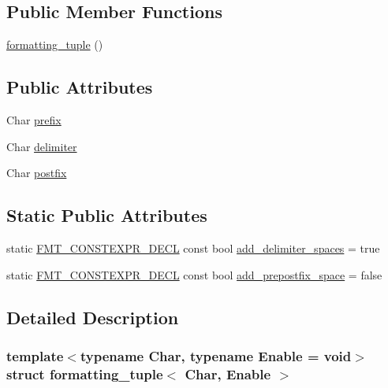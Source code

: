 \subsection*{Public Member Functions}
\begin{DoxyCompactItemize}
\item 
\hyperlink{structformatting__tuple_afe0ff5245dd3f9b567e55b9dd724dba9}{formatting\+\_\+tuple} ()
\end{DoxyCompactItemize}
\subsection*{Public Attributes}
\begin{DoxyCompactItemize}
\item 
Char \hyperlink{structformatting__tuple_a0782dad994369d31b822bcd23456dcd6}{prefix}
\item 
Char \hyperlink{structformatting__tuple_a41a084f3a72cc6bfa848e57dff30b4ed}{delimiter}
\item 
Char \hyperlink{structformatting__tuple_a7e5bf94913811fbd2b551e38c88146d6}{postfix}
\end{DoxyCompactItemize}
\subsection*{Static Public Attributes}
\begin{DoxyCompactItemize}
\item 
static \hyperlink{core_8h_af4388801466a5994a363d6005616371a}{F\+M\+T\+\_\+\+C\+O\+N\+S\+T\+E\+X\+P\+R\+\_\+\+D\+E\+CL} const bool \hyperlink{structformatting__tuple_ac37833d9d42f1fe21c2203a8621e71d6}{add\+\_\+delimiter\+\_\+spaces} = true
\item 
static \hyperlink{core_8h_af4388801466a5994a363d6005616371a}{F\+M\+T\+\_\+\+C\+O\+N\+S\+T\+E\+X\+P\+R\+\_\+\+D\+E\+CL} const bool \hyperlink{structformatting__tuple_a607427f209e091fc99bf81648ae1e882}{add\+\_\+prepostfix\+\_\+space} = false
\end{DoxyCompactItemize}


\subsection{Detailed Description}
\subsubsection*{template$<$typename Char, typename Enable = void$>$\newline
struct formatting\+\_\+tuple$<$ Char, Enable $>$}



